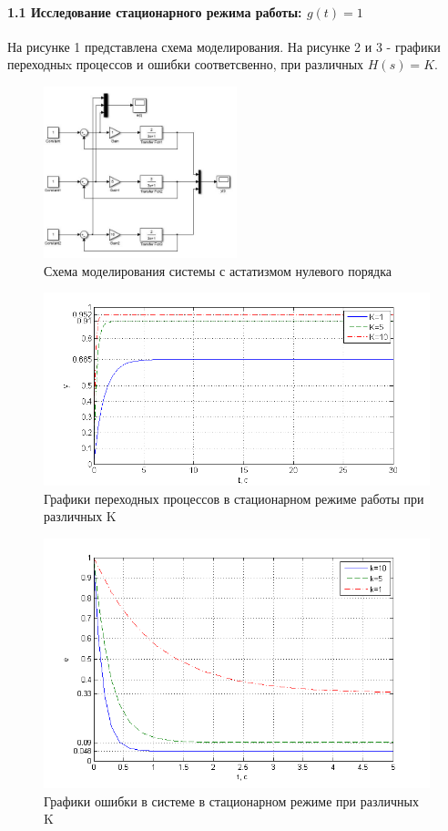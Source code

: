 \documentclass[a4paper, 12pt]{article}
\begin{document}
\paragraph{1.1 Исследование стационарного режима работы: $g(t) = 1$}\hfill\par
На рисунке 1 представлена схема моделирования. На рисунке 2 и 3 - графики переходныx процессов и ошибки соответсвенно, при различных $H(s) = K$. 
\begin{figure}[H]
	\centering
	\includegraphics[width = 0.5\textwidth]{sxema1}
	\caption{Схема моделирования системы с астатизмом нулевого порядка}
\end{figure}
\begin{figure}[h!]
	\centering
	\includegraphics[width = 1\textwidth]{hinh2}
	\caption{Графики переходных процессов в стационарном режиме работы при различных K}
\end{figure}
\newpage
\begin{figure}[h!]
	\centering
	\includegraphics[width = 1\textwidth]{hinh1}
	\caption{Графики ошибки в системе в стационарном режиме при различных K}
\end{figure}
\end{document}
